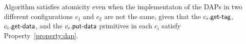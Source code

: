 
\begin{remark}
	Algorithm \ares{} satisfies atomicity even when the implementaton of the  DAPs in two 
	different configurations $c_1$ and $c_2$ are not the same, given that the $c_i.\act{get-tag}$,
	$c_i.\act{get-data}$, and the $c_i.\act{put-data}$ primitives 
	in each $c_i$ satisfy Property~\ref{property:dap}.  
\end{remark}

